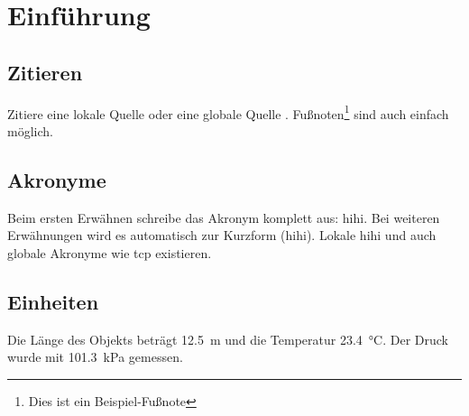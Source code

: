 \section{Einführung}

\subsection{Zitieren}

Zitiere eine lokale Quelle \cite{localref} oder eine globale Quelle \cite{globalref}.
Fußnoten\footnote{Dies ist ein Beispiel-Fußnote} sind auch einfach möglich.

\subsection{Akronyme}

Beim ersten Erwähnen schreibe das Akronym komplett aus: \gls{hihi}.
Bei weiteren Erwähnungen wird es automatisch zur Kurzform (\gls{hihi}).
Lokale \gls{hihi} und auch globale Akronyme wie \gls{tcp} existieren.

\subsection{Einheiten}

Die Länge des Objekts beträgt \SI{12.5}{\meter} und die Temperatur \SI{23.4}{\celsius}.
Der Druck wurde mit \SI{101.3}{\kilo\pascal} gemessen.
